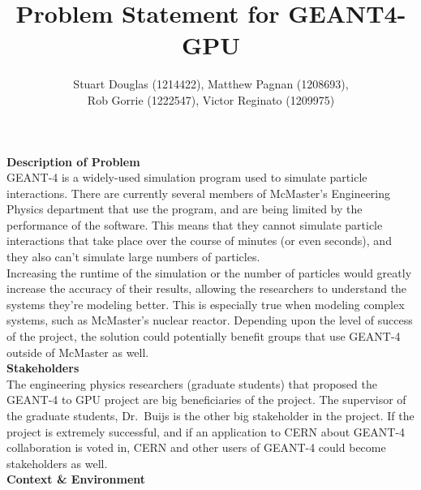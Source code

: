 \documentclass[12pt]{article}
\begin{document}
\title{\vspace{-4em}Problem Statement for GEANT4-GPU} 
\author{Stuart Douglas (1214422), Matthew Pagnan (1208693),
		\\ Rob Gorrie (1222547), Victor Reginato (1209975)}
	
\maketitle


\noindent
\textbf{Description of Problem}\\
GEANT-4 is a widely-used simulation program used to simulate particle
interactions. There are currently several members of McMaster's Engineering
Physics department that use the program, and are being limited by the 
performance of the software. This means that they cannot simulate particle 
interactions that take place over the course of minutes (or even seconds), and 
they also can't simulate large numbers of particles.\\

\noindent
Increasing the runtime of the simulation or the number of particles would greatly increase the accuracy of their results, allowing the researchers to understand the systems they're modeling better. This is especially true when modeling complex systems, such as McMaster's nuclear reactor. Depending upon the level of success of the project, the solution could potentially benefit groups that use GEANT-4 outside of McMaster as well.\\

\noindent
\textbf{Stakeholders}\\
The engineering physics researchers (graduate students) that proposed the GEANT-4 to GPU project are big beneficiaries of the project. The supervisor of the graduate students, Dr.\ Buijs is the other big stakeholder in the project. If the project is extremely successful, and if an application to CERN about GEANT-4 collaboration is voted in, CERN and other users of GEANT-4 could become stakeholders as well.\\

\noindent
\textbf{Context \& Environment}\\
 \\
\end{document}
